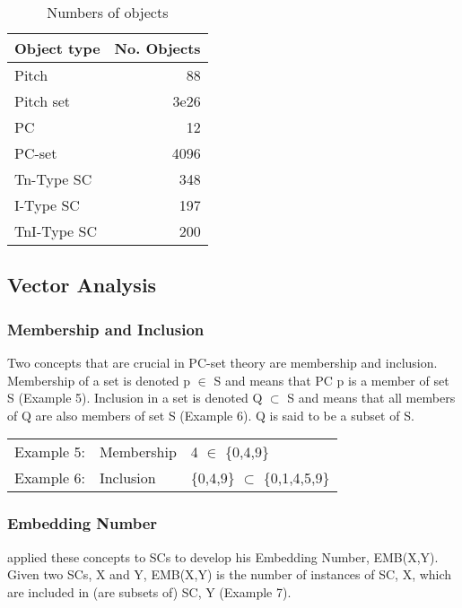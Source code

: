 \documentclass{article}
\begin{document}
\begin{table}[htb]
\caption{Numbers of objects} 
\begin{center}
\begin{tabular}{lr}
 Object type  &  No. Objects  \\
\hline
 Pitch        &           88  \\
 Pitch set    &         3e26  \\
 PC           &           12  \\
 PC-set       &         4096  \\
 Tn-Type SC   &          348  \\
 I-Type SC    &          197  \\
 TnI-Type SC  &          200  \\
\end{tabular}
\end{center}
\end{table}
\subsection{Vector Analysis}
\label{sec-3-3}
\subsubsection{Membership and Inclusion}
\label{sec-3-3-1}

Two concepts that are crucial in PC-set theory are membership and
inclusion. Membership of a set is denoted p $\in$ S and means that PC p
is a member of set S (Example 5). Inclusion in a set is denoted Q
$\subset$ S and means that all members of Q are also members of set S
(Example 6). Q is said to be a subset of S.

\begin{center}
\begin{tabular}{lll}
 Example 5:  &  Membership  &  4 $\in$ \{0,4,9\}                  \\
 Example 6:  &  Inclusion   &  \{0,4,9\} $\subset$ \{0,1,4,5,9\}  \\
\end{tabular}
\end{center}
\subsubsection{Embedding Number}
\label{sec-3-3-2}

\citet{Lewin1979} applied these concepts to SCs to develop his
Embedding Number, EMB(X,Y). Given two SCs, X and Y, EMB(X,Y) is the
number of instances of SC, X, which are included in (are subsets of)
SC, Y (Example 7).
\end{document}
